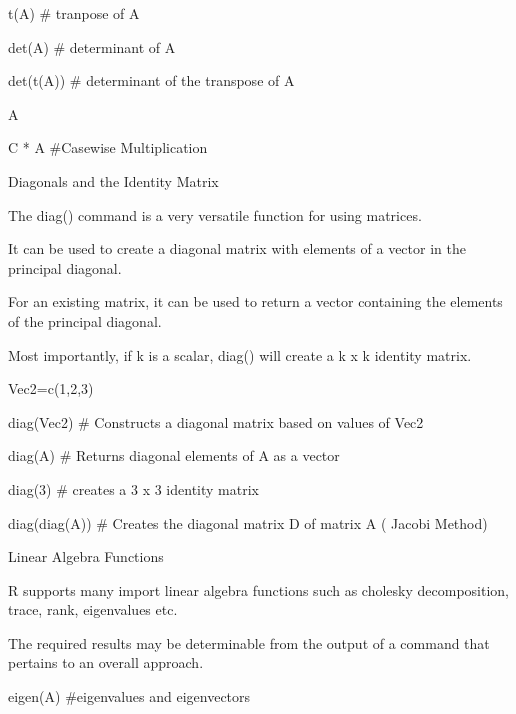 t(A)                                  # tranpose of A


det(A)                               # determinant of A  


det(t(A))                           # determinant of the transpose of A


A %


C * A                                #Casewise Multiplication
 



Diagonals and the Identity Matrix


The diag() command is a very versatile function for using matrices.


It can be used to create a diagonal matrix with elements of a vector in the principal diagonal. 

For an existing matrix, it can be used to return a vector containing the elements of the principal diagonal. 


Most importantly, if k is a scalar, diag() will create a k x k identity matrix.










Vec2=c(1,2,3)


diag(Vec2)     #       Constructs a diagonal matrix based on values of Vec2


diag(A)          #        Returns diagonal elements of A as a vector


diag(3)          #       creates a 3 x 3 identity matrix


diag(diag(A)) #        Creates the diagonal matrix D of matrix A ( Jacobi Method)
 




Linear Algebra Functions


R supports many import linear algebra functions such as cholesky decomposition, trace, rank, eigenvalues etc.


The required results may be determinable from the output of a command that pertains to an overall approach.









eigen(A)       #eigenvalues and eigenvectors       

                                                                      

